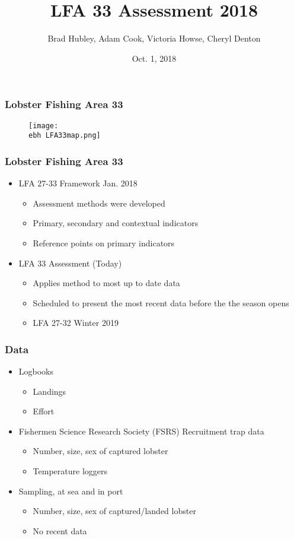 \documentclass{beamer}
\title[LFA 33]{LFA 33 Assessment 2018}
\author[Hubley, Cook, Howse and Denton]{Brad Hubley, Adam Cook, Victoria Howse, Cheryl Denton}
\institute[DFO]{Science Branch, Fisheries and Oceans Canada}
\date{Oct. 1, 2018}
\newcommand{\ebh}{\string~/bio.data/bio.lobster/figures/Assessment/LFA33/} %
\begin{document}
 
\frame{\titlepage}
 


\begin{frame}
\frametitle{Lobster Fishing Area 33}
\begin{figure}
        \begin{center}
            \texttt{[image: \\ebh LFA33map.png]}
        \end{center}
    \end{figure}
\end{frame}


\begin{frame}
\frametitle{Lobster Fishing Area 33}
\begin{itemize}
\item LFA 27-33 Framework Jan. 2018 
\begin{itemize}
\item Assessment methods were developed
\item Primary, secondary and contextual indicators
\item Reference points on primary indicators
\end{itemize}
\item LFA 33 Assessment (Today)
\begin{itemize}
\item Applies method to most up to date data
\item Scheduled to present the most recent data before the the season opens
\item LFA 27-32 Winter 2019 
\end{itemize}
\end{itemize}

\end{frame}


\begin{frame}
\frametitle{Data}
\begin{itemize}
\item Logbooks 
\begin{itemize}
\item Landings
\item Effort
\end{itemize}
\item Fishermen Science Research Society (FSRS) Recruitment trap data
\begin{itemize}
\item Number, size, sex of captured lobster
\item Temperature loggers
\end{itemize}
\item Sampling, at sea and in port
\begin{itemize}
\item Number, size, sex of captured/landed lobster
\item No recent data
\end{itemize}
\end{itemize}

\end{frame}
\end{document}
